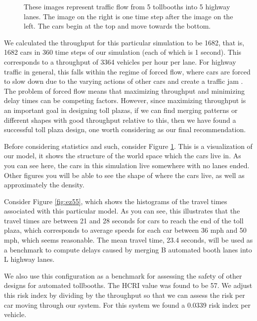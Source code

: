 \documentclass[a4paper, 11pt]{article}
\begin{document}
\begin{figure}
\begin{center}
\begin{tabular}{c c}
\end{tabular}
\end{center}
\caption{These images represent traffic flow from 5 tollbooths into 5 highway lanes. The image on the right is one time step after the image on the left. The cars begin at the top and move towards the bottom.}
\label{fig:5By5}
\end{figure}

We calculated the throughput for this particular simulation to be 1682, that is, 1682 cars in 360 time steps of our simulation (each of which is 1 second). This corresponds to a throughput of 3364 vehicles per hour per lane. For highway traffic in general, this falls within the regime of forced flow, where cars are forced to slow down due to the varying actions of other cars and create a traffic jam \cite{herman}. The problem of forced flow means that maximizing throughput and minimizing delay times can be competing factors. However, since maximizing throughput is an important goal in designing toll plazas, if we can find merging patterns or different shapes with good throughput relative to this, then we have found a successful toll plaza design, one worth considering as our final recommendation.




%
%

Before considering statistics and such, consider Figure \ref{fig:5By5}. This is a visualization of our model, it shows the structure of the world space which the cars live in. As you can see here, the cars in this simulation live somewhere with no lanes ended. Other figures you will be able to see the shape of where the cars live, as well as approximately the density. 

Consider Figure \ref{fig:ez55}, which shows the histograms of the travel times associated with this particular model. As you can see, this illustrates that the travel times are between 21 and 28 seconds for cars to reach the end of the toll plaza, 
which corresponds to average speeds for each car between 36 mph and 50 mph, which seems reasonable. %
The mean travel time, 23.4 seconds, will be used as a benchmark to compute delays caused by merging B automated booth lanes into L highway lanes. 

We also use this configuration as a benchmark for assessing the safety of other designs for automated tollbooths. 
The HCRI value was found to be 57. We adjust this risk index by dividing by the throughput so that we can assess the risk per car moving through our system. For this system we found a 0.0339 risk index per vehicle. 
\end{document}
